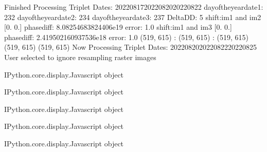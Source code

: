 \documentclass[letterpaper,10pt]{sphinxmanual}
\begin{document}
\begin{sphinxVerbatim}[commandchars=\\\{\}]
Finished Processing Triplet Dates:  20220817\PYGZhy{}20220820\PYGZhy{}20220822
day\PYGZus{}of\PYGZus{}the\PYGZus{}year\PYGZus{}date1:  232
\PYGZhy{}\PYGZhy{}\PYGZhy{}\PYGZhy{}\PYGZhy{}\PYGZhy{}\PYGZhy{}\PYGZhy{}\PYGZhy{}\PYGZhy{}\PYGZhy{}\PYGZhy{}\PYGZhy{}\PYGZhy{}\PYGZhy{}\PYGZhy{}\PYGZhy{}\PYGZhy{}\PYGZhy{}\PYGZhy{}\PYGZhy{}
day\PYGZus{}of\PYGZus{}the\PYGZus{}year\PYGZus{}date2:  234
\PYGZhy{}\PYGZhy{}\PYGZhy{}\PYGZhy{}\PYGZhy{}\PYGZhy{}\PYGZhy{}\PYGZhy{}\PYGZhy{}\PYGZhy{}\PYGZhy{}\PYGZhy{}\PYGZhy{}\PYGZhy{}\PYGZhy{}\PYGZhy{}\PYGZhy{}\PYGZhy{}\PYGZhy{}\PYGZhy{}\PYGZhy{}
day\PYGZus{}of\PYGZus{}the\PYGZus{}year\PYGZus{}date3:  237
\PYGZhy{}\PYGZhy{}\PYGZhy{}\PYGZhy{}\PYGZhy{}\PYGZhy{}\PYGZhy{}\PYGZhy{}\PYGZhy{}\PYGZhy{}\PYGZhy{}\PYGZhy{}\PYGZhy{}\PYGZhy{}\PYGZhy{}\PYGZhy{}\PYGZhy{}\PYGZhy{}\PYGZhy{}\PYGZhy{}\PYGZhy{}
Delta\PYGZus{}DD: 5
shift:im1 and im2 [0. 0.] phasediff: \PYGZhy{}8.08254683824406e\PYGZhy{}19 error: 1.0
shift:im1 and im3 [0. 0.] phasediff: \PYGZhy{}2.419502160937536e\PYGZhy{}18 error: 1.0
(519, 615) :  (519, 615) :  (519, 615)
(519, 615)
(519, 615)
Now Processing Triplet Dates:  20220820\PYGZhy{}20220822\PYGZhy{}20220825
 User selected to ignore resampling raster images 



\PYGZlt{}IPython.core.display.Javascript object\PYGZgt{}
\end{sphinxVerbatim}



\begin{sphinxVerbatim}[commandchars=\\\{\}]
\PYGZlt{}IPython.core.display.Javascript object\PYGZgt{}
\end{sphinxVerbatim}



\begin{sphinxVerbatim}[commandchars=\\\{\}]
\PYGZlt{}IPython.core.display.Javascript object\PYGZgt{}
\end{sphinxVerbatim}



\begin{sphinxVerbatim}[commandchars=\\\{\}]
\PYGZlt{}IPython.core.display.Javascript object\PYGZgt{}
\end{sphinxVerbatim}



\begin{sphinxVerbatim}[commandchars=\\\{\}]
\PYGZlt{}IPython.core.display.Javascript object\PYGZgt{}
\end{sphinxVerbatim}
\end{document}
